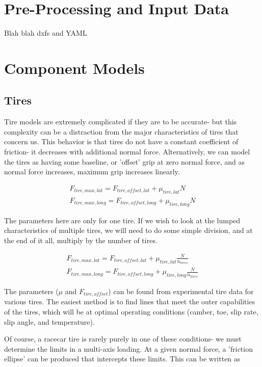 \documentclass{article}
\begin{document}
\section{Pre-Processing and Input Data}
Blah blah dxfs and YAML

\section{Component Models}

\subsection{Tires}

Tire models are extremely complicated if they are to be accurate- but this complexity can be a distraction from the major characteristics of tires that concern us. This behavior is that tires do not have a constant coefficient of friction- it decreases with additional normal force. Alternatively, we can model the tires as having some baseline, or 'offset' grip at zero normal force, and as normal force increases, maximum grip increases linearly.

\begin{align}
	F_{tire,max,lat} = F_{tire,offset,lat} + \mu_{tire,lat} N \\
	F_{tire,max,long} = F_{tire,offset,long} + \mu_{tire,long} N
\end{align}

The parameters here are only for one tire. If we wish to look at the lumped characteristics of multiple tires, we will need to do some simple division, and at the end of it all, multiply by the number of tires.

\begin{align}
	F_{tire,max,lat} = F_{tire,offset,lat} + \mu_{tire,lat} \frac{N}{n_{tires}} \\
	F_{tire,max,long} = F_{tire,offset,long} + \mu_{tire,long} \frac{N}{n_{tires}}
\end{align}

The parameters ($\mu$ and $F_{tire,offset}$) can be found from experimental tire data for various tires. The easiest method is to find lines that meet the outer capabilities of the tires, which will be at optimal operating conditions (camber, toe, slip rate, slip angle, and temperature).

Of course, a racecar tire is rarely purely in one of these conditions- we must determine the limits in a multi-axis loading. At a given normal force, a 'friction ellipse' can be produced that intercepts these limits. This can be written as
\end{document}

